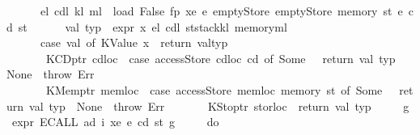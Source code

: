 \begin{isabellebody}
\ \ \ \ \ \ {\isacharparenleft}{\kern0pt}e\isactrlsub l{\isacharcomma}{\kern0pt}\ cd\isactrlsub l{\isacharcomma}{\kern0pt}\ k\isactrlsub l{\isacharcomma}{\kern0pt}\ m\isactrlsub l{\isacharparenright}{\kern0pt}\ {\isasymleftarrow}\ load\ False\ fp\ xe\ e{\isacharprime}{\kern0pt}\ emptyStore\ emptyStore\ {\isacharparenleft}{\kern0pt}memory\ st{\isacharparenright}{\kern0pt}\ e\ cd\ st{\isacharsemicolon}{\kern0pt}\isanewline
\ \ \ \ \ \ {\isacharparenleft}{\kern0pt}val{\isacharcomma}{\kern0pt}\ typ{\isacharparenright}{\kern0pt}\ {\isasymleftarrow}\ expr\ x\ e\isactrlsub l\ cd\isactrlsub l\ {\isacharparenleft}{\kern0pt}st{\isasymlparr}stack{\isacharcolon}{\kern0pt}{\isacharequal}{\kern0pt}k\isactrlsub l{\isacharcomma}{\kern0pt}\ memory{\isacharcolon}{\kern0pt}{\isacharequal}{\kern0pt}m\isactrlsub l{\isasymrparr}{\isacharparenright}{\kern0pt}{\isacharsemicolon}{\kern0pt}\isanewline
\ \ \ \ \ \ case\ val\ of\ KValue\ x\ {\isasymRightarrow}\ return\ {\isacharparenleft}{\kern0pt}val{\isacharcomma}{\kern0pt}typ{\isacharparenright}{\kern0pt}\isanewline
\ \ \ \ \ \ {\isacharbar}{\kern0pt}\ KCDptr\ cdloc\ {\isasymRightarrow}\ {\isacharparenleft}{\kern0pt}case\ accessStore\ cdloc\ cd\ of\ {\isacharparenleft}{\kern0pt}Some\ {\isacharunderscore}{\kern0pt}{\isacharparenright}{\kern0pt}\ {\isasymRightarrow}\ return\ {\isacharparenleft}{\kern0pt}val{\isacharcomma}{\kern0pt}\ typ{\isacharparenright}{\kern0pt}\ {\isacharbar}{\kern0pt}\ None\ {\isasymRightarrow}\ throw\ Err{\isacharparenright}{\kern0pt}\isanewline
\ \ \ \ \ \ {\isacharbar}{\kern0pt}\ KMemptr\ memloc\ {\isasymRightarrow}\ {\isacharparenleft}{\kern0pt}case\ accessStore\ memloc\ {\isacharparenleft}{\kern0pt}memory\ st{\isacharparenright}{\kern0pt}\ of\ {\isacharparenleft}{\kern0pt}Some\ {\isacharunderscore}{\kern0pt}{\isacharparenright}{\kern0pt}\ {\isasymRightarrow}\ return\ {\isacharparenleft}{\kern0pt}val{\isacharcomma}{\kern0pt}\ typ{\isacharparenright}{\kern0pt}\ {\isacharbar}{\kern0pt}\ None\ {\isasymRightarrow}\ throw\ Err{\isacharparenright}{\kern0pt}\isanewline
\ \ \ \ \ \ {\isacharbar}{\kern0pt}\ KStoptr\ storloc\ {\isasymRightarrow}\ return\ {\isacharparenleft}{\kern0pt}val{\isacharcomma}{\kern0pt}\ typ{\isacharparenright}{\kern0pt}\isanewline
\ \ \ \ {\isacharbraceright}{\kern0pt}{\isacharparenright}{\kern0pt}\ g{\isachardoublequoteclose}\isanewline
\isanewline
{\isacharbar}{\kern0pt}\ {\isachardoublequoteopen}expr\ {\isacharparenleft}{\kern0pt}ECALL\ ad\ i\ xe{\isacharparenright}{\kern0pt}\ e\ cd\ st\ g\ {\isacharequal}{\kern0pt}\isanewline
\ \ \ \ {\isacharparenleft}{\kern0pt}do\ {\isacharbraceleft}{\kern0pt}\isanewline

\end{isabellebody}
